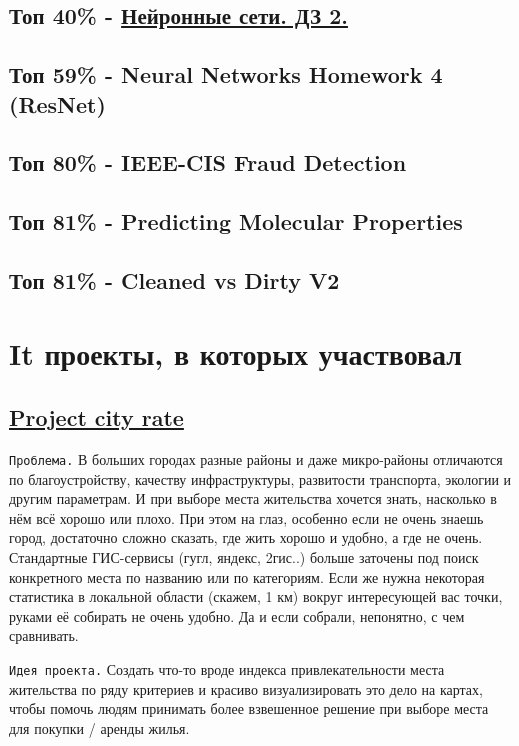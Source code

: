 \documentclass[11pt]{article}
\begin{document}
\subsection{Топ 40\% - \href{https://www.kaggle.com/c/nn-track-2019-spring-hw2}{Нейронные сети. ДЗ 2.}}
\label{sec:orga98b218}
\subsection{Топ 59\% - Neural Networks Homework 4 (ResNet)}
\label{sec:org7c462b3}
\subsection{Топ 80\% - IEEE-CIS Fraud Detection}
\label{sec:org3a7346b}
\subsection{Топ 81\% - Predicting Molecular Properties}
\label{sec:orgf06cf5d}
\subsection{Топ 81\% - Cleaned vs Dirty V2}
\label{sec:org752b0af}
\section{It проекты, в которых участвовал}
\label{sec:org98aada9}
\subsection{\href{http://167.172.97.243:8000/map/}{Project city rate}}
\label{sec:org6a7b043}
\texttt{Проблема.} В больших городах разные районы и даже микро-районы отличаются по благоустройству, качеству инфраструктуры, развитости
транспорта, экологии и другим параметрам. И при выборе места жительства хочется знать, насколько в нём всё хорошо или плохо. При этом на
глаз, особенно если не очень знаешь город, достаточно сложно сказать, где жить хорошо и удобно, а где не очень. Стандартные ГИС-сервисы (гугл, яндекс, 2гис..) больше заточены под поиск конкретного места по названию или по категориям. Если же нужна некоторая статистика в локальной области (скажем, 1 км) вокруг интересующей вас точки, руками её собирать не очень удобно. Да и если собрали, непонятно, с чем сравнивать.

\texttt{Идея проекта.}
Создать что-то вроде индекса привлекательности места жительства по ряду критериев и красиво визуализировать это дело на картах, чтобы помочь людям принимать более взвешенное решение при выборе места для покупки / аренды жилья.
\end{document}
